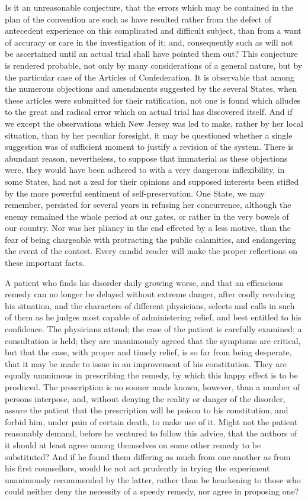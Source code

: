 Is it an unreasonable conjecture, that the errors which may be contained in the plan of the convention are such as have resulted rather from the defect of antecedent experience on this complicated and difficult subject, than from a want of accuracy or care in the investigation of it; and, consequently such as will not be ascertained until an actual trial shall have pointed them out? This conjecture is rendered probable, not only by many considerations of a general nature, but by the particular case of the Articles of Confederation. It is observable that among the numerous objections and amendments suggested by the several States, when these articles were submitted for their ratification, not one is found which alludes to the great and radical error which on actual trial has discovered itself. And if we except the observations which New Jersey was led to make, rather by her local situation, than by her peculiar foresight, it may be questioned whether a single suggestion was of sufficient moment to justify a revision of the system. There is abundant reason, nevertheless, to suppose that immaterial as these objections were, they would have been adhered to with a very dangerous inflexibility, in some States, had not a zeal for their opinions and supposed interests been stifled by the more powerful sentiment of self-preservation. One State, we may remember, persisted for several years in refusing her concurrence, although the enemy remained the whole period at our gates, or rather in the very bowels of our country. Nor was her pliancy in the end effected by a less motive, than the fear of being chargeable with protracting the public calamities, and endangering the event of the contest. Every candid reader will make the proper reflections on these important facts.

A patient who finds his disorder daily growing worse, and that an efficacious remedy can no longer be delayed without extreme danger, after coolly revolving his situation, and the characters of different physicians, selects and calls in such of them as he judges most capable of administering relief, and best entitled to his confidence. The physicians attend; the case of the patient is carefully examined; a consultation is held; they are unanimously agreed that the symptoms are critical, but that the case, with proper and timely relief, is so far from being desperate, that it may be made to issue in an improvement of his constitution. They are equally unanimous in prescribing the remedy, by which this happy effect is to be produced. The prescription is no sooner made known, however, than a number of persons interpose, and, without denying the reality or danger of the disorder, assure the patient that the prescription will be poison to his constitution, and forbid him, under pain of certain death, to make use of it. Might not the patient reasonably demand, before he ventured to follow this advice, that the authors of it should at least agree among themselves on some other remedy to be substituted? And if he found them differing as much from one another as from his first counsellors, would he not act prudently in trying the experiment unanimously recommended by the latter, rather than be hearkening to those who could neither deny the necessity of a speedy remedy, nor agree in proposing one?

